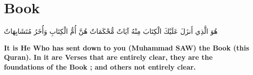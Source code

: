 \chapter{Book}
\begin{center}
    {\Huge    
        \begin{Arabic}
            هُوَ الَّذِي أَنزَلَ عَلَيْكَ الْكِتَابَ مِنْهُ آيَاتٌ مُّحْكَمَاتٌ هُنَّ أُمُّ الْكِتَابِ وَأُخَرُ مُتَشَابِهَاتٌ
        \end{Arabic}
    }    
\end{center}
\vspace*{\fill}
\vspace{3cm}
\begin{center}
    \Large \textbf{It is He Who has sent down to you (Muhammad SAW) the Book (this Quran). In it are Verses that are entirely clear, they are the foundations of the Book ; and others not entirely clear. }
\end{center}
